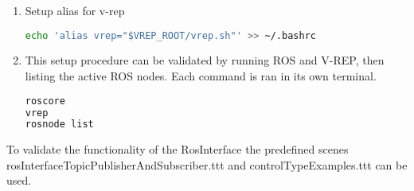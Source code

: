 \documentclass{article}
\begin{document}
\begin{multicols*}{2}
\begin{enumerate}
\begin{lstlisting}[language=bash,breaklines=true]
echo 'export VREP_ROOT="/home/user/V-REP_PRO_EDU_V3_3_2_64_Linux/"' >> ~/.bashrc 
source ~/.bashrc
cp -iv devel/lib/libv_repExtRosInterface.so "$VREP_ROOT/"
\end{lstlisting}
\item Setup alias for v-rep 
\begin{lstlisting}[language=bash,breaklines=true]
echo 'alias vrep="$VREP_ROOT/vrep.sh"' >> ~/.bashrc 
\end{lstlisting}
\item This setup procedure can be validated by running ROS and V-REP, then listing the active ROS nodes. Each command is ran in its own terminal. 
\begin{lstlisting}[language=bash,breaklines=true]
roscore
vrep
rosnode list
\end{lstlisting}
\end{enumerate}
To validate the functionality of the RosInterface the predefined scenes rosInterfaceTopicPublisherAndSubscriber.ttt and controlTypeExamples.ttt can be used. 
\end{multicols*}
 
\end{document}
